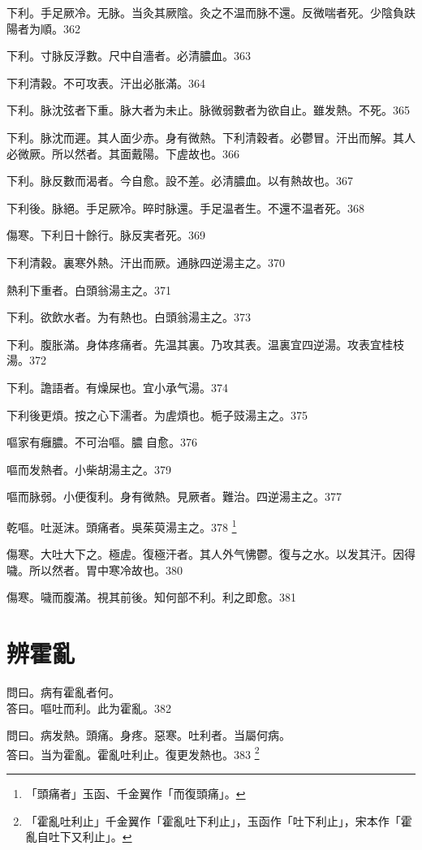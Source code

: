 下利。手足厥{\khaaitp 冷}。无脉。{\khaaitp 当灸其厥陰。}灸之不温{\khaaitp 而脉不還}。反微喘者死。少陰負趺陽者为順。362

下利。寸脉反浮數。尺中自濇者。必清膿血。363

下利清穀。不可攻表。汗出必胀滿。364

下利。脉沈弦者下重。脉大者为未止。脉微弱數者为欲自止。雖发熱。不死。365

下利。脉沈而遲。其人面少赤。身有微熱。下利清穀者。必鬱冒。汗出而解。其人必微厥。所以然者。其面戴陽。下虗故也。366

下利。脉反數而渴者。今自愈。設不差。必清膿血。以有熱故也。367

下利後。脉絕。手足厥{\khaaitp 冷}。晬时脉還。手足温者生。不還{\khaaitp 不温}者死。368

傷寒。下利日十餘行。脉反実者死。369

下利清穀。裏寒外熱。汗出而厥。通脉四逆湯主之。370

熱利下重者。白頭翁湯主之。371

下利。欲飲水者。为有熱也。白頭翁湯主之。373

下利。腹{\khaaitp 胀}滿。身体疼痛者。先温其裏。乃攻其表。温裏宜四逆湯。攻表宜桂枝湯。372

下利。譫語者。有燥屎也。宜{\khaaitp 小}承气湯。374

下利後更煩。按之心下濡者。为虗煩也。栀子{\khaaitp 豉}湯主之。375

嘔家有癰膿。不可治嘔。膿{\sungtpii 𥁞}自愈。376

嘔而发熱者。小柴胡湯主之。379

嘔而脉弱。小便復利。身有微熱。見厥者。難治。四逆湯主之。377

乾嘔。吐涎沫。頭痛者。{\khaaitp 吳}茱萸湯主之。378
	\footnote{「頭痛者」玉函、千金翼作「而復頭痛」。}

傷寒。大吐大下之。極虗。復極汗者。其人外气怫鬱。復与之水。以发其汗。因得噦。所以然者。胃中寒冷故也。380

傷寒。噦而腹滿。視其前後。知何部不利。利之即愈。381

\chapter{辨霍亂}

問曰。病有霍亂者何。\\
答曰。嘔吐而利。此为霍亂。382

問曰。病发熱。頭痛。身疼。惡寒。吐利者。当屬何病。\\
答曰。当为霍亂。霍亂吐利止。復更发熱也。383
	\footnote{
	「霍亂吐利止」千金翼作「霍亂吐下利止」，玉函作「吐下利止」，宋本作「霍亂自吐下又利止」。
	}

